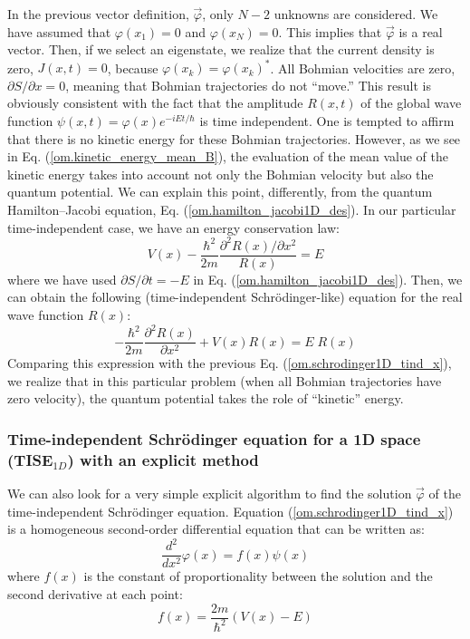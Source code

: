 \documentclass[onecolumn,nofootinbib, secnumarabic, amsmath, nobibnotes,11pt,aps,pra]{revtex4-1}
\newcommand{\eref}[1]{Eq. (\ref{#1})}
\newcommand{\Eref}[1]{Equation (\ref{#1})}
\begin{document}
In the previous vector definition, $\vec \varphi$, only $N - 2$ unknowns are considered. We have assumed that $\varphi(x_1) = 0$ and $\varphi(x_N) = 0$. This implies that $\vec \varphi$ is a real vector. Then, if we select an eigenstate,  we realize that the current density is zero, $J(x,t) = 0$, because $\varphi(x_k) = \varphi(x_k)^*$. All Bohmian velocities are zero, $\partial S/\partial x = 0$, meaning that Bohmian trajectories do not ``move.'' This result is obviously consistent with the fact that the amplitude $R(x,t)$ of the global wave function $\psi(x,t) = \varphi(x) e^{-iE t/\hbar}$ is time independent. One is tempted to affirm that there is no kinetic energy for these Bohmian trajectories. However, as we see in \eref{om.kinetic_energy_mean_B}, the evaluation of the mean value of the kinetic energy takes into account not only the Bohmian velocity but also the quantum potential. We can explain this point, differently, from the quantum Hamilton--Jacobi equation, \eref{om.hamilton_jacobi1D_des}. In our particular time-independent case, we have an energy conservation law:
\begin{equation*}
V(x) - \frac{\hbar^2} {2 m} \frac{{\partial}^2 R(x)/ \partial x^2} {R(x)} = E
\end{equation*}
where we have used $\partial S/\partial t = -E$ in \eref{om.hamilton_jacobi1D_des}. Then, we can obtain the following (time-independent Schr\"odinger-like) equation for the real wave function $R(x)$:
\begin{equation}
\label{om.schrodinger1D_tind_x_for R}
-\frac{\hbar^2} {2 m} \frac{{\partial}^2 R(x)} {\partial x^2} + V(x) R(x) = E \; R(x)
\end{equation}
Comparing this expression with the previous
\eref{om.schrodinger1D_tind_x}, we realize that in this particular
problem (when all Bohmian trajectories have zero velocity), the quantum
potential takes the role of ``kinetic'' energy.

\subsubsection{Time-independent Schr\"odinger equation for a 1D space (TISE$_{1D}$) with an explicit method}

We can also look for a very simple explicit algorithm to find the solution $\vec \varphi$ of the time-independent Schr\"odinger equation. \Eref{om.schrodinger1D_tind_x} is a homogeneous second-order differential equation that can be written as:
\begin{equation}
\frac{{d}^{2}}{d{x}^{2}}\varphi(x) = f(x)\psi (x)
\label{om.numerov1}
\end{equation}
where $f(x)$ is the constant of proportionality between the solution and the second derivative at each point:
\begin{equation}
f(x) = \frac{ 2 m} {{\hbar }^{2}}(V(x) - {E})
\end{equation}
\end{document}
